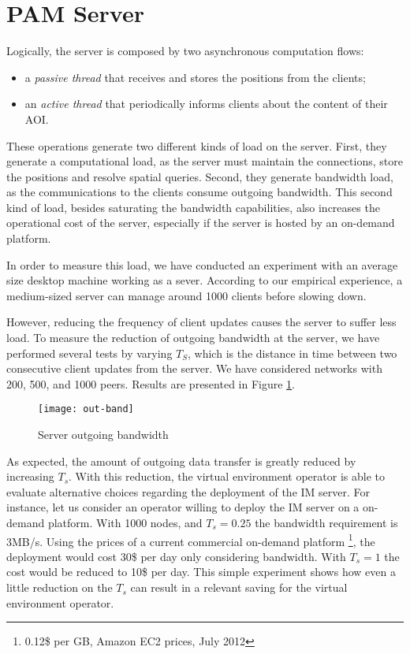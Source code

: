 \documentclass[final,10pt,a5paper]{phdimt}
\theoremstyle{definition}
\begin{document}
\section{PAM Server}




Logically, the server is composed by two asynchronous computation flows:
\begin{itemize}
\item a \textit{passive thread} that receives and stores the positions from the clients;
\item an \textit{active thread} that periodically informs clients about the content of their AOI.
\end{itemize}

These operations generate two different kinds of load on the server. First, they generate a computational load, as the server must maintain the connections, store the positions and resolve spatial queries. Second, they generate bandwidth load, as the communications to the clients consume outgoing bandwidth. This second kind of load, besides saturating the bandwidth capabilities, also increases the operational cost of the server, especially if the server is hosted by an on-demand platform.

In order to measure this load, we have conducted an experiment with an average size desktop machine working as a sever.
According to our empirical experience, a medium-sized server can manage around 1000 clients before slowing down. 


However, reducing the frequency of client updates causes the server to suffer less load.
To measure the reduction of outgoing bandwidth at the server, we have performed several tests by varying $T_S$, which is the distance in time between two consecutive client updates from the server.
We have considered networks with 200, 500, and 1000 peers. 
Results are presented in Figure \ref{fig:band}.

\begin{figure}[tbh]
\centering
\texttt{[image: out-band]}
\caption{Server outgoing bandwidth}\label{fig:band}
\end{figure}

As expected, the amount of outgoing data transfer is greatly reduced by increasing $T_s$.
With this reduction, the virtual environment operator is able to evaluate alternative choices regarding the deployment of the IM server.
For instance, let us consider an operator willing to deploy the IM server on a on-demand platform.
With 1000 nodes, and $T_s = 0.25$ the bandwidth requirement is 3MB/s.
Using the prices of a current commercial on-demand platform \footnote{0.12\$ per GB, Amazon EC2 prices, July 2012}, the deployment would cost 30\$ per day only considering bandwidth. With $T_s = 1$ the cost would be reduced to 10\$ per day.
This simple experiment shows how even a little reduction on the $T_s$ can result in a relevant saving for the virtual environment operator.
\end{document}
